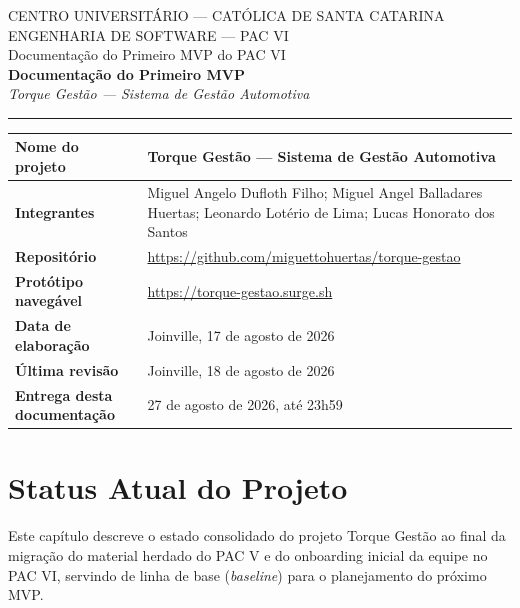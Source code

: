 \documentclass[11pt, a4paper]{article}
\begin{document}
\thispagestyle{empty}
\begin{center}
    {\small CENTRO UNIVERSITÁRIO --- CATÓLICA DE SANTA CATARINA}\\
    {\small ENGENHARIA DE SOFTWARE --- PAC VI}\\
    {\small Documentação do Primeiro MVP do PAC VI}\\[14pt]
    {\LARGE\bfseries Documentação do Primeiro MVP}\\[6pt]
    {\Large\itshape Torque Gestão --- Sistema de Gestão Automotiva}
\end{center}

\vspace{8pt}
{\color{torqueamber}\rule{\linewidth}{2.5pt}}
\vspace{18pt}

\renewcommand{\arraystretch}{1.35}
\noindent
\begin{tabular}{|L{3.2cm}|L{12.3cm}|}
\hline
\textbf{Nome do projeto} & Torque Gestão --- Sistema de Gestão Automotiva \\
\hline
\textbf{Integrantes} & Miguel Angelo Dufloth Filho; Miguel Angel Balladares Huertas; Leonardo Lotério de Lima; Lucas Honorato dos Santos \\
\hline
\textbf{Repositório} & \url{https://github.com/miguettohuertas/torque-gestao} \\
\hline
\textbf{Protótipo navegável} & \url{https://torque-gestao.surge.sh} \\
\hline
\textbf{Data de elaboração} & Joinville, 17 de agosto de 2026 \\
\hline
\textbf{Última revisão} & Joinville, 18 de agosto de 2026 \\
\hline
\textbf{Entrega desta documentação} & 27 de agosto de 2026, até 23h59 \\
\hline
\end{tabular}
\vspace{4pt}

\tableofcontents

\section{Status Atual do Projeto}

Este capítulo descreve o estado consolidado do projeto Torque Gestão ao final da migração do material herdado do PAC V e do onboarding inicial da equipe no PAC VI, servindo de linha de base (\emph{baseline}) para o planejamento do próximo MVP.
\end{document}
